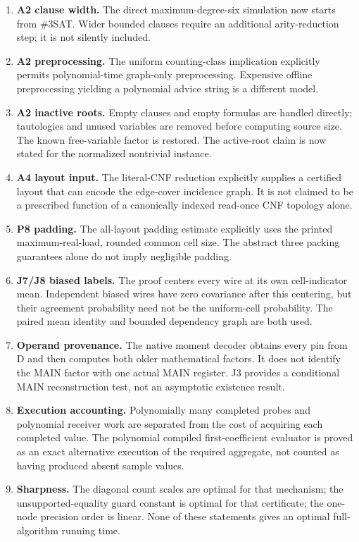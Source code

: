 \documentclass[11pt,a4paper]{article}
\providecommand{\tightlist}{\setlength{\itemsep}{0pt}\setlength{\parskip}{0pt}}
\begin{document}
\begin{enumerate}
\def\labelenumi{\arabic{enumi}.}
\tightlist
\item
  \textbf{A2 clause width.} The direct maximum-degree-six simulation now
  starts from \#3SAT. Wider bounded clauses require an additional
  arity-reduction step; it is not silently included.
\item
  \textbf{A2 preprocessing.} The uniform counting-class implication
  explicitly permits polynomial-time graph-only preprocessing. Expensive
  offline preprocessing yielding a polynomial advice string is a
  different model.
\item
  \textbf{A2 inactive roots.} Empty clauses and empty formulas are
  handled directly; tautologies and unused variables are removed before
  computing source size. The known free-variable factor is restored. The
  active-root claim is now stated for the normalized nontrivial
  instance.
\item
  \textbf{A4 layout input.} The literal-CNF reduction explicitly
  supplies a certified layout that can encode the edge-cover incidence
  graph. It is not claimed to be a prescribed function of a canonically
  indexed read-once CNF topology alone.
\item
  \textbf{P8 padding.} The all-layout padding estimate explicitly uses
  the printed maximum-real-load, rounded common cell size. The abstract
  three packing guarantees alone do not imply negligible padding.
\item
  \textbf{J7/J8 biased labels.} The proof centers every wire at its own
  cell-indicator mean. Independent biased wires have zero covariance
  after this centering, but their agreement probability need not be the
  uniform-cell probability. The paired mean identity and bounded
  dependency graph are both used.
\item
  \textbf{Operand provenance.} The native moment decoder obtains every
  pin from D and then computes both older mathematical factors. It does
  not identify the MAIN factor with one actual MAIN register. J3
  provides a conditional MAIN reconstruction test, not an asymptotic
  existence result.
\item
  \textbf{Execution accounting.} Polynomially many completed probes and
  polynomial receiver work are separated from the cost of acquiring each
  completed value. The polynomial compiled first-coefficient evaluator
  is proved as an exact alternative execution of the required aggregate,
  not counted as having produced absent sample values.
\item
  \textbf{Sharpness.} The diagonal count scales are optimal for that
  mechanism; the unsupported-equality guard constant is optimal for that
  certificate; the one-node precision order is linear. None of these
  statements gives an optimal full-algorithm running time.
\end{enumerate}
\end{document}
